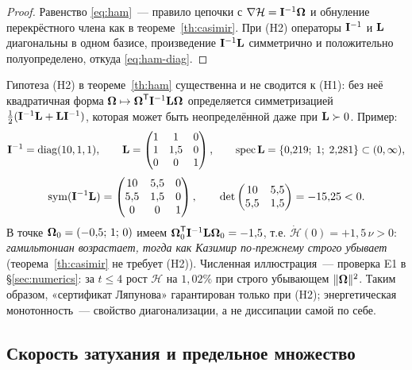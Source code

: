 \begin{proof}
Равенство \eqref{eq:ham}~--- правило цепочки с
$\nabla\mathcal H = \mathbf{I}^{-1}\boldsymbol{\Omega}$ и обнуление перекрёстного члена как в
теореме~\ref{th:casimir}. При \textup{(H2)} операторы $\mathbf{I}^{-1}$ и $\mathbf{L}$
диагональны в одном базисе, произведение $\mathbf{I}^{-1}\mathbf{L}$ симметрично и
положительно полуопределено, откуда \eqref{eq:ham-diag}.
\end{proof}

\begin{remark}\label{rem:commutator}
Гипотеза \textup{(H2)} в теореме~\ref{th:ham} существенна и не сводится
к \textup{(H1)}: без неё квадратичная форма
$\boldsymbol{\Omega} \mapsto \boldsymbol{\Omega}^{\mathsf T}\mathbf{I}^{-1}\mathbf{L}\boldsymbol{\Omega}$ определяется
симметризацией $\tfrac12(\mathbf{I}^{-1}\mathbf{L} + \mathbf{L}\mathbf{I}^{-1})$, которая может
быть неопределённой даже при $\mathbf{L} \succ 0$. Пример:
\[
  \mathbf{I}^{-1} = \operatorname{diag}(10,1,1),\qquad
  \mathbf{L} = \begin{pmatrix} 1 & 1 & 0\\ 1 & 1{,}5 & 0\\ 0 & 0 & 1 \end{pmatrix},
  \qquad \operatorname{spec} \mathbf{L} = \{0{,}219;\;1;\;2{,}281\} \subset (0,\infty),
\]
\[
  \operatorname{sym}(\mathbf{I}^{-1}\mathbf{L}) = \begin{pmatrix} 10 & 5{,}5 & 0\\ 5{,}5 & 1{,}5 & 0\\ 0 & 0 & 1 \end{pmatrix},
  \qquad \det\begin{pmatrix} 10 & 5{,}5\\ 5{,}5 & 1{,}5 \end{pmatrix} = -15{,}25 < 0 .
\]
В точке $\boldsymbol{\Omega}_0 = (-0{,}5;\,1;\,0)$ имеем
$\boldsymbol{\Omega}_0^{\mathsf T}\mathbf{I}^{-1}\mathbf{L}\boldsymbol{\Omega}_0 = -1{,}5$, т.е.
$\dot{\mathcal H}(0) = +1{,}5\,\nu > 0$: \emph{гамильтониан возрастает,
тогда как Казимир по-прежнему строго убывает} (теорема~\ref{th:casimir}
не требует \textup{(H2)}). Численная иллюстрация~--- проверка E1 в
\S\ref{sec:numerics}: за $t \le 4$ рост $\mathcal H$ на $1{,}02\%$ при
строго убывающем $\|\boldsymbol{\Omega}\|^2$. Таким образом, «сертификат Ляпунова»
гарантирован только при \textup{(H2)}; энергетическая монотонность~---
свойство диагонализации, а не диссипации самой по себе.
\end{remark}

\subsection{Скорость затухания и предельное множество}

